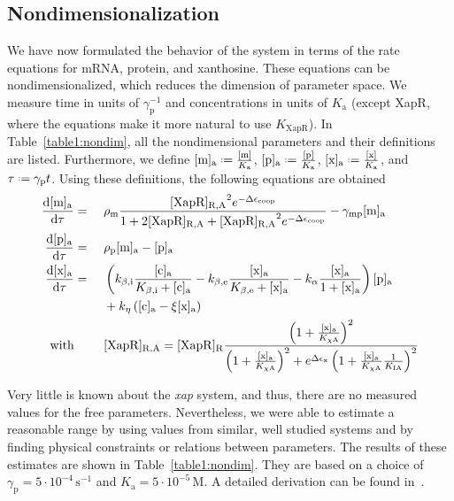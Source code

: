 \documentclass[10pt,letterpaper]{article}
\newcommand{\unit}[1]{\,\mathrm{#1}}
\newcommand{\n}[1]{\mathrm{#1}}
\newcommand{\dd}[2]{\frac{\mathrm{d} #1}{\mathrm{d} #2}}
\newcommand*{\defeq}{\mathrel{\vcenter{\baselineskip0.5ex \lineskiplimit0pt
			\hbox{\scriptsize.}\hbox{\scriptsize.}}}%
	=}
\begin{document}
\subsection*{Nondimensionalization}
We have now formulated the behavior of the system in terms of the rate
equations for mRNA, protein, and xanthosine. These equations can be
nondimensionalized, which reduces the dimension of parameter space. We
measure time in units of $\gamma_{\n{p}}^{-1}$ and concentrations in units
of $K_{\n{a}}$ (except XapR, where the equations make it more natural to use
$K_{\n{XapR}}$). In Table~\ref{table1:nondim}, all the nondimensional
parameters and their definitions are listed. Furthermore, we define
$\n{[m]_a} \defeq \frac{\n{[m]}}{K_{\n{a}}}$, $\n{[p]_a} \defeq
\frac{\n{[p]}}{K_{\n{a}}}$, $\n{[x]_a} \defeq \frac{\n{[x]}}{K_{\n{a}}}$,
and $\tau \defeq \gamma_{\n{p}} t$. Using these definitions, the following
equations are obtained
\begin{alignat}{2}
\dd{\mathrm{[m]_a}}{\tau} &= \ &&
\rho_{\n{m}} 
\frac{
	\mathrm{[XapR]_{R,A}}^2 
	e^{- \Delta \epsilon_{\text{coop}}}
}{
	1 + 
	2 \mathrm{[XapR]_{R,A}} +
	\mathrm{[XapR]_{R,A}}^2 e^{- \Delta \epsilon_{\text{coop}}}
}
- \gamma_{\n{mp}} \mathrm{[m]_a}
\\
\dd{\mathrm{[p]_a}}{\tau} &= \ &&
\rho_{\n{p}} \mathrm{[m]_a}
- \mathrm{[p]_a}
\\
\dd{\mathrm{[x]_a}}{\tau} &= \ && \left(k_{\n{\beta,i}} \frac{\n{[c]_a}}{K_{\n{\beta,i}} + \n{[c]_a}} - k_{\n{\beta,e}} \frac{\n{[x]_a}}{K_{\n{\beta,e}} + \n{[x]_a}} - k_{\n{\alpha}} \frac{\n{[x]_a}}{1 + \n{[x]_a}}\right) \mathrm{[p]_a} \\ & && + k_{\n{\eta}} \left(\mathrm{[c]_a} - \xi \mathrm{[x]_a}\right)
\nonumber \\
\text{with} & && \raggedleft [\n{XapR}]_{\mathrm{R,\n{A}}} = [\n{XapR}]_{\mathrm{R}} \frac{\left(1 + \frac{\mathrm{[x]_{\n{a}}}}{K_{\n{\chi A}}}\right)^2}{\left(1 + \frac{\mathrm{[x]_{\n{a}}}}{K_{\n{\chi A}}}\right)^2 + e^{\Delta \epsilon_{\n{x}}} \left(1+\frac{\mathrm{[x]_{\n{a}}}}{K_{\n{\chi A}}} \frac{1}{K_{\n{IA}}}\right)^2} \nonumber
\end{alignat}

Very little is known about the \emph{xap} system, and thus, there are no
measured values for the free parameters. Nevertheless, we were able to
estimate a reasonable range by using values from similar, well studied
systems and by finding physical constraints or relations between parameters.
The results of these estimates are shown in Table~\ref{table1:nondim}. They
are based on a choice of $\gamma_{\n{p}} = 5 \cdot 10^{-4} \unit{s^{-1}}$
and $K_{\n{a}} = 5 \cdot 10^{-5} \unit{M}$. A detailed derivation can be
found in~. 
\end{document}
